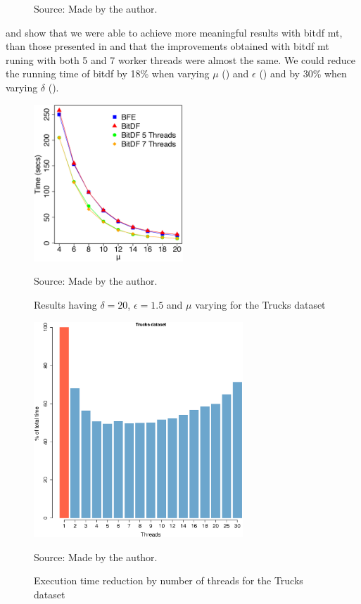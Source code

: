 {\begin{figure}[h!]
\begin{subfigure}[t]{0.49\textwidth}
        \label{fig:trucks_complete_vary_g}
    \end{subfigure}
    \footnotesize{Source: Made by the author.}
    \label{fig:trucks_complete_results}
\end{figure}

 and  show that we were able to achieve more
meaningful results with \ac{bitdf} \ac{mt}, than those presented in  and that the improvements
obtained with \ac{bitdf} \ac{mt} runing with both 5 and 7 worker threads were almost the same. We could reduce the
running time of \ac{bitdf} by 18\% when varying $\mu$ () and $\epsilon$
() and by 30\% when varying $\delta$ ().

\begin{figure}[h!]
    \centering
    \caption{Results having $\delta = 20$, $\epsilon = 1.5$ and $\mu$ varying for the Trucks dataset}
    \centerline{\includegraphics[width=0.5\textwidth]{images/Trucks_complete_varying_n.eps}}
    \footnotesize{Source: Made by the author.}
    \label{fig:trucks_complete_vary_n}
\end{figure}

\begin{figure}[h!]
    \centering
    \caption{Execution time reduction by number of threads for the Trucks dataset}
    \centerline{\includegraphics[width=0.7\textwidth]{images/Trucks_thread.eps}}
    \footnotesize{Source: Made by the author.}
    \label{fig:trucks_threads}
\end{figure}

}
